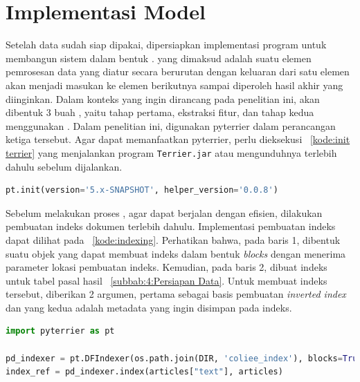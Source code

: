\section{Implementasi Model}
\label{subbab:4:Implementasi Model}
Setelah data sudah siap dipakai, dipersiapkan implementasi program untuk membangun sistem \ir{} dalam bentuk \pipeline{}. \Pipeline{} yang dimaksud adalah suatu elemen pemrosesan data yang diatur secara berurutan dengan keluaran dari satu elemen akan menjadi masukan ke elemen berikutnya sampai diperoleh hasil akhir yang diinginkan. Dalam konteks \cascaded{} \ir{} yang ingin dirancang pada penelitian ini, akan dibentuk 3 buah \pipeline{}, yaitu \pipeline{} tahap \ranking{} pertama, \pipeline{} ekstraksi fitur, dan \pipeline{} tahap \ranking{} kedua menggunakan \lambdamart{}. Dalam penelitian ini, digunakan \library{} pyterrier dalam perancangan ketiga \pipeline{} tersebut. Agar dapat memanfaatkan pyterrier, perlu dieksekusi \kode{}~\ref{kode:init terrier} yang menjalankan program \lstinline{Terrier.jar} atau mengunduhnya terlebih dahulu sebelum dijalankan.
\begin{lstlisting}[language=Python, caption={Menjalankan program Terrier}, label={kode:init terrier}]
pt.init(version='5.x-SNAPSHOT', helper_version='0.0.8')
\end{lstlisting}

Sebelum melakukan proses \retrieval{}, agar dapat berjalan dengan efisien, dilakukan pembuatan indeks dokumen terlebih dahulu. Implementasi pembuatan indeks dapat dilihat pada \kode{}~\ref{kode:indexing}. Perhatikan bahwa, pada baris 1, dibentuk suatu objek yang dapat membuat indeks dalam bentuk \textit{blocks} dengan menerima parameter lokasi pembuatan indeks. Kemudian, pada baris 2, dibuat indeks untuk tabel pasal hasil \parsing{} \subbab{}~\ref{subbab:4:Persiapan Data}. Untuk membuat indeks tersebut, diberikan 2 argumen, pertama sebagai basis pembuatan \textit{inverted index} dan yang kedua adalah metadata yang ingin disimpan pada indeks.
\begin{lstlisting}[language=Python, caption={Pembentukan indeks}, label={kode:indexing}]
import pyterrier as pt

pd_indexer = pt.DFIndexer(os.path.join(DIR, 'coliee_index'), blocks=True)
index_ref = pd_indexer.index(articles["text"], articles)
\end{lstlisting}

